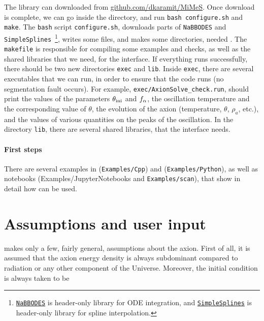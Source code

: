 \documentclass[11pt,a4paper]{article}
\begin{document}
The library can downloaded from \href{https://github.com/dkaramit/MiMeS}{github.com/dkaramit/MiMeS}. Once download is complete, we can go inside the \mimes directory, and run {\tt bash configure.sh} and  {\tt make}.  The {\tt bash} script {\tt configure.sh}, downloads parts of {\tt NaBBODES} and {\tt SimpleSplines}~\footnote{\href{https://github.com/dkaramit/NaBBODES}{\tt NaBBODES} is header-only library for ODE integration, and \href{https://github.com/dkaramit/SimpleSplines}{\tt SimpleSplines} is header-only library for spline interpolation.}, writes some files, and  makes some directories, needed \mimes. The {\tt makefile} is responsible for compiling some examples and checks, as well as the shared libraries that we need, for the \PY interface.  If everything runs successfully, there should be two new directories {\tt exec} and {\tt lib}. Inside {\tt exec}, there are several executables that we can run, in order to ensure that the code runs (\eg no segmentation fault occurs). For example, {\tt exec/AxionSolve\_check.run}, should print the values of the parameters $\theta_{\rm ini}{}$ and $f_{\alpha}{}$, the oscillation temperature and the corresponding value of $\theta$, the evolution of the axion (\eg temperature, $\theta$, $\rho_a$, etc.), and the values of various quantities on the peaks of the oscillation.  In the directory {\tt lib}, there are several shared libraries, that the \PY interface needs.

\paragraph{First steps} There are several examples in \CPP ({\tt Examples/Cpp}) and \PY ({\tt Examples/Python}), as well as \JUPY  notebooks ({Examples/JupyterNotebooks} and {\tt Examples/scan}), that show in detail how \mimes can be used.

\section{Assumptions and user input}\label{sec:assumptions}
\setcounter{equation}{0}

\mimes makes only a few, fairly general, assumptions about the axion. First of all, it is assumed that the axion energy density is always subdominant compared to radiation or any other component of the Universe. Moreover, the initial condition is always taken to be 






\newpage
 {}
                         
\end{document}
